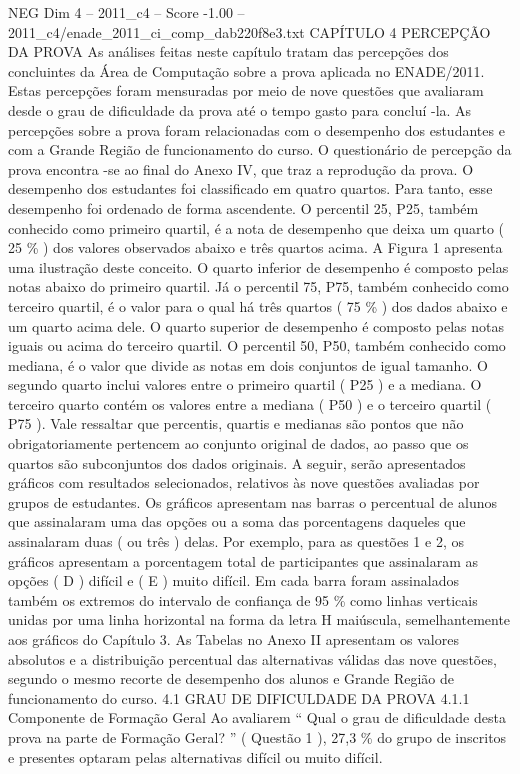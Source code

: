 \begin{textsample}{NEG Dim 4 – 2011\_c4 – Score -1.00 – 2011\_c4/enade\_2011\_ci\_comp\_dab220f8e3.txt}  \label{ex:f4_neg_121}
CAPÍTULO 4 PERCEPÇÃO DA PROVA As análises feitas neste capítulo tratam das percepções dos concluintes da Área de Computação sobre a prova aplicada no ENADE/2011.
Estas percepções foram mensuradas por meio de nove questões que avaliaram desde o grau de dificuldade da prova até o tempo gasto para concluí -la.
As percepções sobre a prova foram relacionadas com o desempenho dos estudantes e com a Grande Região de funcionamento do curso.
O questionário de percepção da prova encontra -se ao final do Anexo IV, que traz a reprodução da prova.
O desempenho dos estudantes foi classificado em quatro quartos.
Para tanto, esse desempenho foi ordenado de forma ascendente.
O percentil 25, P25, também conhecido como primeiro quartil, é a nota de desempenho que deixa um quarto ( 25 \% ) dos valores observados abaixo e três quartos acima.
A Figura 1 apresenta uma ilustração deste conceito.
O quarto inferior de desempenho é composto pelas notas abaixo do primeiro quartil.
Já o percentil 75, P75, também conhecido como terceiro quartil, é o valor para o qual há três quartos ( 75 \% ) dos dados abaixo e um quarto acima dele.
O quarto superior de desempenho é composto pelas notas iguais ou acima do terceiro quartil.
O percentil 50, P50, também conhecido como mediana, é o valor que divide as notas em dois conjuntos de igual tamanho.
O segundo quarto inclui valores entre o primeiro quartil ( P25 ) e a mediana.
O terceiro quarto contém os valores entre a mediana ( P50 ) e o terceiro quartil ( P75 ).
Vale ressaltar que percentis, quartis e medianas são pontos que não obrigatoriamente pertencem ao conjunto original de dados, ao passo que os quartos são subconjuntos dos dados originais.
A seguir, serão apresentados gráficos com resultados selecionados, relativos às nove questões avaliadas por grupos de estudantes.
Os gráficos apresentam nas barras o percentual de alunos que assinalaram uma das opções ou a soma das porcentagens daqueles que assinalaram duas ( ou três ) delas.
Por exemplo, para as questões 1 e 2, os gráficos apresentam a porcentagem total de participantes que assinalaram as opções ( D ) difícil e ( E ) muito difícil.
Em cada barra foram assinalados também os extremos do intervalo de confiança de 95 \% como linhas verticais unidas por uma linha horizontal na forma da letra H maiúscula, semelhantemente aos gráficos do Capítulo 3.
As Tabelas no Anexo II apresentam os valores absolutos e a distribuição percentual das alternativas válidas das nove questões, segundo o mesmo recorte de desempenho dos alunos e Grande Região de funcionamento do curso. 4.1 GRAU DE DIFICULDADE DA PROVA 4.1.1 Componente de Formação Geral Ao avaliarem “ Qual o grau de dificuldade desta prova na parte de Formação Geral? ” ( Questão 1 ), 27,3 \% do grupo de inscritos e presentes optaram pelas alternativas difícil ou muito difícil.

\end{textsample}
